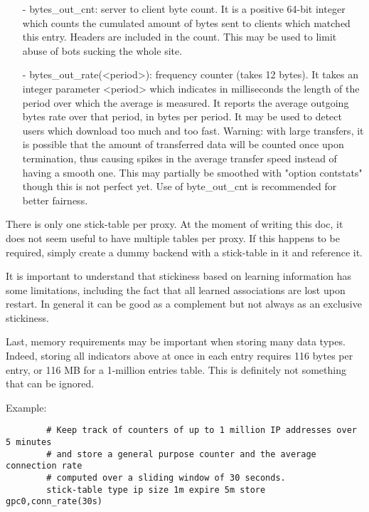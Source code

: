 \begin{itemize}
  \item[-] bytes\_out\_cnt: server to client byte count. It is a positive 64-bit
      integer which counts the cumulated amount of bytes sent to clients which
      matched this entry. Headers are included in the count. This may be used
      to limit abuse of bots sucking the whole site.

  \item[-] bytes\_out\_rate(<period>): frequency counter (takes 12 bytes). It takes
      an integer parameter <period> which indicates in milliseconds the length
      of the period over which the average is measured. It reports the average
      outgoing bytes rate over that period, in bytes per period. It may be used
      to detect users which download too much and too fast. Warning: with large
      transfers, it is possible that the amount of transferred data will be
      counted once upon termination, thus causing spikes in the average
      transfer speed instead of having a smooth one. This may partially be
      smoothed with "option contstats" though this is not perfect yet. Use of
      byte\_out\_cnt is recommended for better fairness.
  \end{itemize}

  There is only one stick-table per proxy. At the moment of writing this doc,
  it does not seem useful to have multiple tables per proxy. If this happens
  to be required, simply create a dummy backend with a stick-table in it and
  reference it.

  It is important to understand that stickiness based on learning information
  has some limitations, including the fact that all learned associations are
  lost upon restart. In general it can be good as a complement but not always
  as an exclusive stickiness.

  Last, memory requirements may be important when storing many data types.
  Indeed, storing all indicators above at once in each entry requires 116 bytes
  per entry, or 116 MB for a 1-million entries table. This is definitely not
  something that can be ignored.

  Example:
  \begin{verbatim}
        # Keep track of counters of up to 1 million IP addresses over 5 minutes
        # and store a general purpose counter and the average connection rate
        # computed over a sliding window of 30 seconds.
        stick-table type ip size 1m expire 5m store gpc0,conn_rate(30s)
  \end{verbatim}

